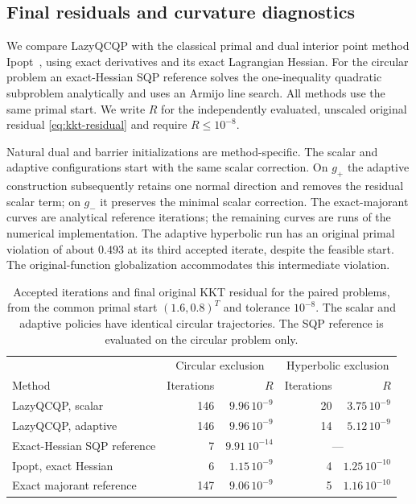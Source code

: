 \documentclass[pdflatex,sn-mathphys-num]{sn-jnl}
\theoremstyle{thmstyleone}
\theoremstyle{thmstylethree}
\begin{document}
\subsection{Final residuals and curvature diagnostics}

We compare LazyQCQP with the classical primal and dual interior point
method Ipopt~\cite{WachterBiegler2006}, using exact derivatives and
its exact Lagrangian Hessian. For the circular problem an exact-Hessian
SQP reference solves the one-inequality quadratic subproblem analytically
and uses an Armijo line search. All methods use the same primal start.
We write $R$ for the independently evaluated, unscaled original residual
\eqref{eq:kkt-residual} and require $R\leq10^{-8}$.

Natural dual and barrier initializations are method-specific.
The scalar and adaptive configurations
start with the same scalar correction. On $g_+$ the adaptive
construction subsequently retains one normal direction and removes
the residual scalar term; on $g_-$ it preserves the minimal scalar
correction. The exact-majorant curves are analytical reference iterations;
the remaining curves are runs of the numerical implementation.
The adaptive hyperbolic run has an original primal violation of about
$0.493$ at its third accepted iterate, despite the feasible start.
The original-function globalization accommodates this intermediate
violation.


\begin{table}[tb]
\centering\small
\caption{Accepted iterations and final original KKT residual for the paired
problems, from the common primal start $(1.6,0.8)^T$ and tolerance $10^{-8}$.
The scalar and adaptive policies have identical circular trajectories.
The SQP reference is evaluated on the circular problem only.}
\label{tab:toy-comparison}
\begin{tabular}{lrrrr}
\toprule
&\multicolumn{2}{c}{Circular exclusion}&\multicolumn{2}{c}{Hyperbolic exclusion}\\
Method&Iterations&$R$&Iterations&$R$\\
\midrule
LazyQCQP, scalar&146&$9.96\,10^{-9}$&20&$3.75\,10^{-9}$\\
LazyQCQP, adaptive&146&$9.96\,10^{-9}$&14&$5.12\,10^{-9}$\\
Exact-Hessian SQP reference&7&$9.91\,10^{-14}$&\multicolumn{2}{c}{---}\\
Ipopt, exact Hessian&6&$1.15\,10^{-9}$&4&$1.25\,10^{-10}$\\
Exact majorant reference&147&$9.06\,10^{-9}$&5&$1.16\,10^{-10}$\\
\bottomrule
\end{tabular}
\end{table}
\end{document}

